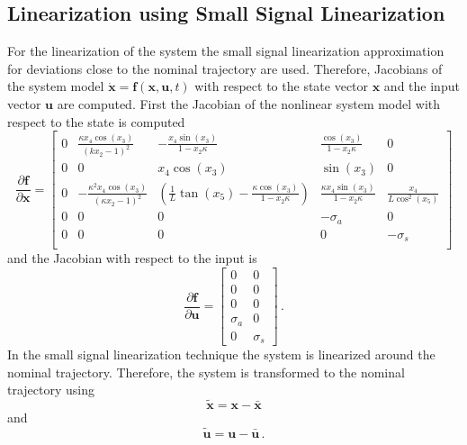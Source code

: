 \subsection{Linearization using Small Signal Linearization}
For the linearization of the system the small signal linearization approximation for deviations close to the nominal trajectory are used.
Therefore, Jacobians of the system model $\mathbf{\dot{x}} = \mathbf{f}(\mathbf{x}, \mathbf{u}, t)$ with respect to the state vector $\mathbf{x}$ and the input vector $\mathbf{u}$ are computed.
First the Jacobian of the nonlinear system model with respect to the state is computed
\begin{equation}
	\frac{\partial \mathbf{f}}{\partial \mathbf{x}} = \begin{bmatrix}
		0 & \frac{\kappa x_4 \cos(x_3)}{(kx_2 - 1)^2} & -\frac{x_4 \sin (x_3)}{1 - x_2 \kappa} & \frac{\cos (x_3)}{1 - x_2 \kappa} & 0\\
		0 & 0 & x_4 \cos(x_3) & \sin(x_3) & 0\\
		0 & -\frac{\kappa^2 x_4 \cos(x_3)}{(\kappa x_2 - 1)^2} & \left(\frac{1}{L}\tan(x_5) - \frac{\kappa \cos (x_3)}{1 - x_2 \kappa}\right) & \frac{\kappa x_4 \sin(x_3)}{1 - x_2 \kappa} & \frac{x_4}{L \cos^2(x_5)}\\
		0 & 0 & 0 & -\sigma_a & 0\\
		0 & 0 & 0 & 0& -\sigma_s\\
	\end{bmatrix}
\end{equation}
and the Jacobian with respect to the input is
\begin{equation}
	\frac{\partial \mathbf{f}}{\partial \mathbf{u}} = \begin{bmatrix}
		0 & 0\\
		0 & 0\\
		0 & 0\\
		\sigma_a & 0\\
		0 & \sigma_s
	\end{bmatrix}\, .
\end{equation}
In the small signal linearization technique the system is linearized around the nominal trajectory.
Therefore, the system is transformed to the nominal trajectory using
\begin{equation}
	\boldsymbol{\tilde{x}} = \mathbf{x} - \boldsymbol{\bar{x}}
\end{equation}
and
\begin{equation}
	\boldsymbol{\tilde{u}} = \mathbf{u} - \boldsymbol{\bar{u}} \, .
\end{equation}
